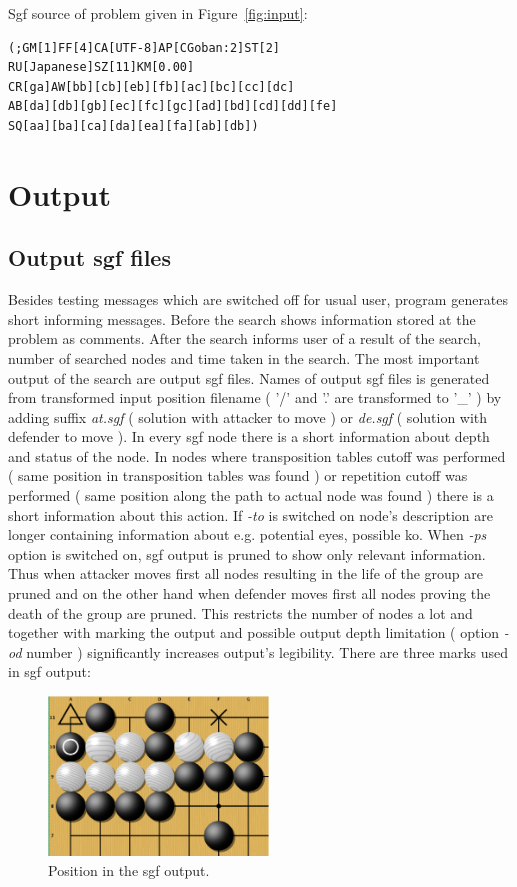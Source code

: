 Sgf source of problem given in Figure~\ref{fig:input}:

\begin{verbatim} 
(;GM[1]FF[4]CA[UTF-8]AP[CGoban:2]ST[2]
RU[Japanese]SZ[11]KM[0.00]
CR[ga]AW[bb][cb][eb][fb][ac][bc][cc][dc]
AB[da][db][gb][ec][fc][gc][ad][bd][cd][dd][fe]
SQ[aa][ba][ca][da][ea][fa][ab][db])
\end{verbatim}

\section{Output}

\subsection{Output sgf files} Besides testing messages which are switched off for usual user, program generates short informing messages. Before the
search shows information stored at the problem as comments. After the search informs user of a result of the search, number of searched nodes and time
taken in the search. The most important output of the search are output sgf files. Names of output sgf files is generated from transformed input
position filename ( '/' and '.' are transformed to '\_' ) by adding suffix {\it at.sgf} ( solution with attacker to move ) or {\it de.sgf} ( solution
with defender to move ). In every sgf node there is a short information about depth and status of the node. In nodes where transposition tables cutoff
was performed ( same position in transposition tables was found ) or repetition cutoff was performed ( same position along the path to actual node was
found ) there is a short information about this action. If {\it -to} is switched on node's description are longer containing information about e.g.
potential eyes, possible ko. When {\it -ps} option is switched on, sgf output is pruned to show only relevant information. Thus when attacker moves
first all nodes resulting in the life of the group are pruned and on the other hand when defender moves first all nodes proving the death of the group
are pruned. This restricts the number of nodes a lot and together with marking the output and possible output depth limitation ( option {\it -od}
number ) significantly increases output's legibility. There are three marks used in sgf output: 

\begin{figure}
\begin{center}
\includegraphics[width=2.3in]{src/pics/output.eps} 
\caption{Position in the sgf output. \label{fig:output}}
\end{center}
\end{figure}

